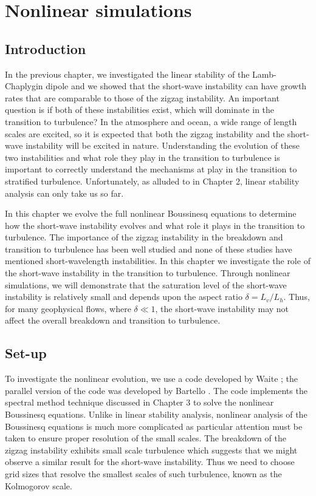 \chapter{Nonlinear simulations}

\section{Introduction}
In the previous chapter, we investigated the linear stability of the Lamb-Chaplygin dipole and we showed that the short-wave instability can have growth rates that are comparable to those of the zigzag instability. An important question is if both of these instabilities exist, which will dominate in the transition to turbulence? In the atmosphere and ocean, a wide range of length scales are excited, so it is expected that both the zigzag instability and the short-wave instability will be excited in nature. Understanding the evolution of these two instabilities and what role they play in the transition to turbulence is important to correctly understand the mechanisms at play in the transition to stratified turbulence. Unfortunately, as alluded to in Chapter 2, linear stability analysis can only take us so far. 

In this chapter we evolve the full nonlinear Boussinesq equations to determine how the short-wave instability evolves and what role it plays in the transition to turbulence. The importance of the zigzag instability in the breakdown and transition to turbulence has been well studied \cite{augier2012,waitesmol2008,augierbillant2011,delonclebc2008} and none of these studies have mentioned short-wavelength instabilities. In this chapter we investigate the role of the short-wave instability in the transition to turbulence. Through nonlinear simulations, we will demonstrate that the saturation level of the short-wave instability is relatively small and depends upon the aspect ratio $\delta=L_{v}/L_{h}$. Thus, for many geophysical flows, where $\delta\ll 1$, the short-wave instability may not affect the overall breakdown and transition to turbulence. 

\section{Set-up} 
To investigate the nonlinear evolution, we use a code developed by Waite \cite{waite2011}; the parallel version of the code was developed by Bartello \cite{bartello1995}. The code implements the spectral method technique discussed in Chapter 3 to solve the nonlinear Boussinesq equations. Unlike in linear stability analysis, nonlinear analysis of the Boussinesq equations is much more complicated as particular attention must be taken to ensure proper resolution of the small scales. The breakdown of the zigzag instability exhibits small scale turbulence \cite{augier2012} which suggests that we might observe a similar result for the short-wave instability. Thus we need to choose grid sizes that resolve the smallest scales of such turbulence, known as the Kolmogorov scale. 

